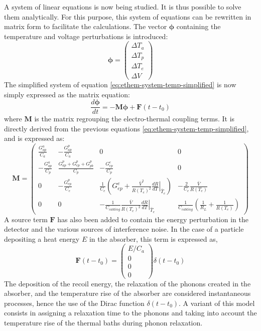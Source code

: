 A system of linear equations is now being studied. It is thus possible to solve them analytically. For this purpose, this system of equations can be rewritten in matrix form to facilitate the calculations. The vector $\bm{\phi}$ containing the temperature and voltage perturbations is introduced:
\begin{equation}
\label{eq:ethem-phi}
\bm{\phi} = 
\left( \begin{array}{c}
\Delta T_a\\
\Delta T_p\\
\Delta T_e\\
\Delta V
\end{array} \right)
\end{equation}
The simplified system of equation \ref{eq:ethem-system-temp-simplified} is now simply expressed as the matrix equation:
\begin{equation}
\label{eq:ethem-matrix-eq}
\frac{d \bm{\phi}}{d t}= - \bm{M} \bm{\phi} + \bm{F}(t-t_0)
\end{equation}
where $\bm{M}$ is the matrix regrouping the electro-thermal coupling terms. It is directly derived from the previous equations \ref{eq:ethem-system-temp-simplified}, and is expressed as:
\begin{equation}
\label{eq:ethem-coupling-mat}
\bm{M} = 
\left( \begin{array}{cccc}
 \frac{G_{ap}^a}{C_a}&-\frac{G_{ap}^p}{C_a}&0&0 \\
 -\frac{G_{ap}^a}{C_p}&\frac{G_{ap}^p+G_{ep}^p+G_{pb}^p}{C_p}&-\frac{G_{ep}^e}{C_p}&0 \\
0&-\frac{G_{ep}^p}{C_e}&\frac{1}{C_e}\left(G_{ep}^e + \frac{\bar{V}^2}{R(T_e)^2}  \left.\frac{d R}{d T}\right\vert_{\bar{T}_e} \right)&-\frac{2}{C_e}\frac{\bar{V}}{R(T_e)}\\
0&0&-\frac{1}{C_{cabling}}\frac{\bar{V}}{R(T_e)^2} \left.\frac{d R}{d T}\right\vert_{\bar{T}_e} &\frac{1}{C_{cabling}}\left( \frac{1}{R_L} + \frac{1}{R(T_e)} \right)
\end{array} \right)
\end{equation}
A source term $\bm{F}$ has also been added to contain the energy perturbation in the detector and the various sources of interference noise. In the case of a particle depositing a heat energy $E$ in the absorber, this term is expressed as,
\begin{equation}
\bm{F}(t-t_0) = 
\left( \begin{array}{c}
E/C_a \\
0 \\
0 \\
0
\end{array} \right) \delta (t-t_0)
\end{equation}
The deposition of the recoil energy, the relaxation of the phonons created in the absorber, and the temperature rise of the absorber are considered instantaneous processes, hence the use of the Dirac function $\delta (t-t_0)$. A variant of this model consists in assigning a relaxation time to the phonons and taking into account the temperature rise of the thermal baths during phonon relaxation.

